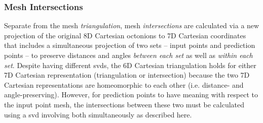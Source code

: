\documentclass[preprint,12pt]{elsarticle}
\begin{document}
\subsubsection{Mesh Intersections}
Separate from the mesh \textit{triangulation}, mesh \textit{intersections} are calculated via a new projection of the original 8D Cartesian octonions to 7D Cartesian coordinates that includes a simultaneous projection of two sets -- input points and prediction points -- to preserve distances and angles \textit{between each set} as well as \textit{within each set}. Despite having different \glspl{svd}, the 6D Cartesian triangulation holds for either 7D Cartesian representation (triangulation or intersection) because the two 7D Cartesian representations are homeomorphic to each other (i.e. distance- and angle-preserving). However, for prediction points to have meaning with respect to the input point mesh, the intersections between these two must be calculated using a \gls{svd} involving both simultaneously as described here.
\end{document}
